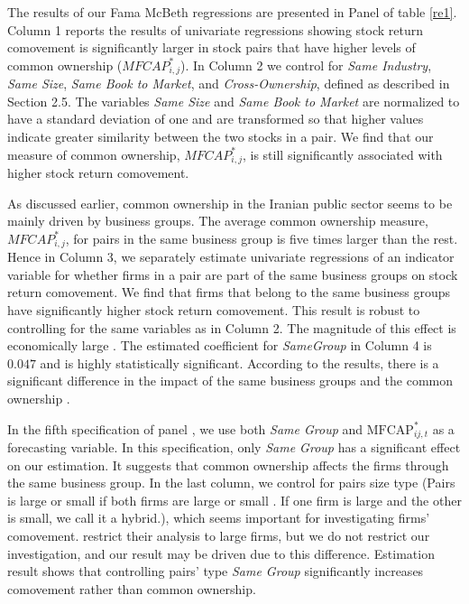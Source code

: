 	
The results of our Fama McBeth regressions are presented in Panel  of table \ref{re1}.
Column 1 reports the results of univariate regressions showing stock return comovement is significantly larger in stock pairs that have higher levels of common ownership ($ MFCAP^*_{i,j}$). 
 In Column 2 we control for  \textit{Same Industry}, \textit{Same Size}, \textit{Same Book to Market}, and \textit{Cross-Ownership}, defined as described in Section 2.5. The variables \textit{Same Size} and \textit{Same Book to Market} are normalized to have a standard deviation of one and are transformed so that higher values indicate greater similarity between the two stocks in a pair. We find that our measure of common ownership, $ MFCAP^*_{i,j}$, is still significantly associated with higher stock return comovement. 
		
		
		As discussed earlier, common ownership in the Iranian public sector seems to be mainly driven by business groups. The average common ownership measure, $ MFCAP^*_{i,j}$, for pairs in the same business group is five times larger than the rest. Hence in Column 3, we separately estimate univariate regressions of an indicator variable for whether firms in a pair are part of the same business groups on stock return comovement. We find that firms that belong to the same business groups have significantly higher stock return comovement. This result is robust to controlling for the same variables as in Column 2. The magnitude of this effect is economically large
		. The estimated coefficient for \textit{SameGroup} in Column 4 is $0.047$ and is highly statistically significant. According to the results, there is a significant difference in the impact of the same business groups and the common ownership
		. 
		
		In the fifth specification of panel , we use both \textit{Same Group}  and $\text{MFCAP}^*_{ij,t}$ as a forecasting variable. In this specification, only  \textit{Same Group} has a significant effect on our estimation. It suggests that common ownership affects the firms through the same business group. In the last column, we control for pairs size type (Pairs is large or small if both firms are large or small . If one firm is large and the other is small, we call it a hybrid.), which seems important for investigating firms' comovement.	\cite{AntonPolk} restrict their analysis to large firms, but we do not restrict our investigation, and our result may be driven due to this difference. Estimation result shows that controlling pairs' type \textit{Same Group} significantly increases comovement rather than common ownership.
	
